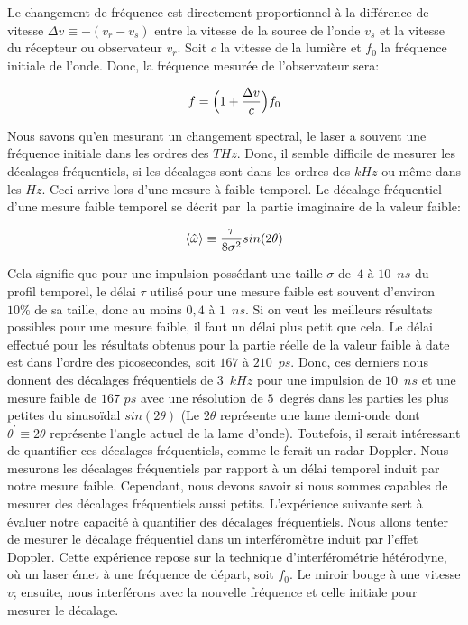 \begin{onehalfspace}
    \noindent Le changement de fréquence est directement 
    proportionnel à la différence de vitesse 
    $\Delta v \equiv -(v_r - v_s)$ entre la 
    vitesse de la source de l'onde $v_s$ et la vitesse du 
    récepteur ou observateur $v_r$. Soit $c$ la vitesse de la 
    lumière et $f_0$ la fréquence initiale de l'onde. Donc, 
    la fréquence mesurée de l'observateur sera:

    \begin{equation}
        f = \Bigl( 1 + \frac{\Delta v}{c} \Bigr)f_0
    \end{equation}

    \noindent Nous savons qu’en mesurant un changement 
    spectral, le laser a souvent une fréquence 
    initiale dans les ordres des $THz$. Donc, il 
    semble difficile de mesurer les décalages 
    fréquentiels, si les décalages sont dans les 
    ordres des $kHz$ ou même dans les $Hz$. Ceci 
    arrive lors d’une mesure à faible temporel. 
    Le décalage fréquentiel d’une mesure faible 
    temporel se décrit par la partie imaginaire 
    de la valeur faible:

    \begin{equation}
        \expval{\hat{\omega}} \equiv \frac{\tau}{8\sigma^2}sin(2\theta)
    \end{equation}

    \noindent Cela signifie que pour une impulsion possédant une 
    taille $\sigma$ de $4$ à $10$ $ns$ du profil temporel, le 
    délai $\tau$ utilisé pour une mesure faible est 
    souvent d’environ $10 \%$ de sa taille, donc 
    au moins $0,4$ à $1$ $ns$. Si on veut les 
    meilleurs résultats possibles pour une 
    mesure faible, il faut un délai plus petit 
    que cela. Le délai effectué pour les résultats 
    obtenus pour la partie réelle de la valeur 
    faible à date est dans l’ordre des 
    picosecondes, soit $167$ à $210$ $ps$. Donc, ces 
    derniers nous donnent des décalages 
    fréquentiels de $3$ $kHz$ pour une impulsion de 
    $10$ $ns$ et une mesure faible de $167$ $ps$ avec 
    une résolution de $5$ degrés dans les parties 
    les plus petites du sinusoïdal $sin(2\theta)$ 
    (Le $2\theta$ représente une lame demi-onde dont $\theta^{\prime} \equiv 2\theta$ 
    représente l'angle actuel de la lame d'onde). 
    Toutefois, il serait intéressant de 
    quantifier ces décalages fréquentiels, comme 
    le ferait un radar Doppler. Nous mesurons 
    les décalages fréquentiels par rapport à un 
    délai temporel induit par notre mesure 
    faible. Cependant, nous devons savoir si 
    nous sommes capables de mesurer des 
    décalages fréquentiels aussi petits. 
    L'expérience suivante sert à évaluer notre 
    capacité à quantifier des décalages 
    fréquentiels. Nous allons tenter de mesurer 
    le décalage fréquentiel dans un 
    interféromètre induit par l'effet Doppler. 
    Cette expérience repose sur la technique 
    d’interférométrie hétérodyne, où un laser 
    émet à une fréquence de départ, soit $f_0$. 
    Le miroir bouge à une vitesse $v$; ensuite, 
    nous interférons avec la nouvelle fréquence 
    et celle initiale pour mesurer le 
    décalage.
\end{onehalfspace}

